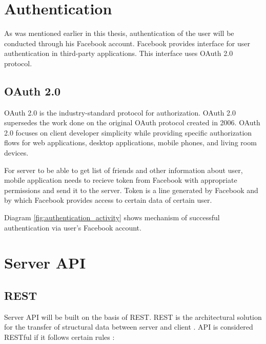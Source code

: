 \section{Authentication}
As was mentioned earlier in this thesis, authentication of the user will be conducted through his Facebook account.
Facebook provides interface for user authentication in third-party applications. This interface uses OAuth 2.0 protocol.

\subsection{OAuth 2.0}
OAuth 2.0 is the industry-standard protocol for authorization. OAuth 2.0 supersedes the work done on the original OAuth
protocol created in 2006. OAuth 2.0 focuses on client developer simplicity while providing specific authorization flows
for web applications, desktop applications, mobile phones, and living room devices. \cite{oauth}

For server to be able to get list of friends and other information about user, mobile application needs to recieve
token from Facebook with appropriate permissions and send it to the server. Token is a line generated by Facebook and
by which Facebook provides access to certain data of certain user.

Diagram \ref{fig:authentication_activity} shows mechanism of successful authentication via user's Facebook account.


\newcommand{\ritem}[1]{
    \item \textbf{#1} \par
}
\section{Server API}

\subsection{REST}
Server API will be built on the basis of \ac{REST}. \ac{REST} is the architectural solution for the transfer of
structural data between server and client \cite{rest}.
API is considered RESTful if it follows certain rules \cite{whatisrest}:

